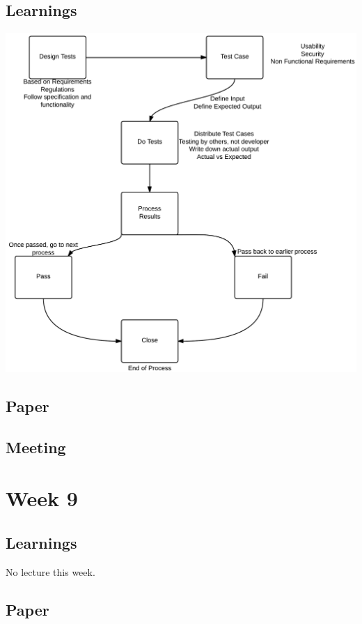 \section{Learnings}
\begin{center}
\includegraphics[scale=0.24]{testing.png}
\end{center}

\section{Paper}

\section{Meeting}
\chapter{Week 9}

\section{Learnings}

No lecture this week.

\section{Paper}

